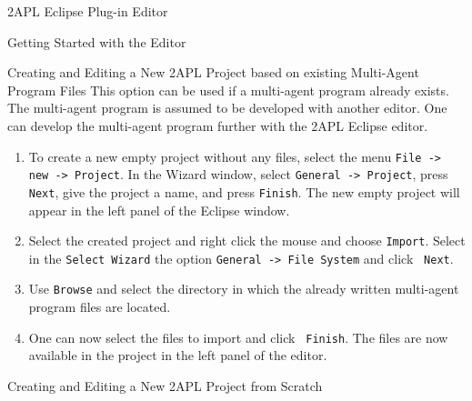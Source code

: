 \begin{chapter}{2APL Eclipse Plug-in Editor}
\begin{section}{Getting Started with the Editor}
\begin{subsection}{Creating and Editing a New 2APL Project based on existing Multi-Agent Program Files}
This option can be used if a multi-agent program already exists. The
multi-agent program is assumed to be developed with another editor.
One can develop the multi-agent program further with the 2APL
Eclipse editor.

\begin{enumerate}
        \item To create a new empty project without any files, select the menu \texttt{File -> new -> Project}.
        In the Wizard window, select \texttt{General -> Project}, press {\tt Next}, give the project
        a name, and press {\tt Finish}. The new empty project will
        appear in the left panel of the Eclipse window.

        \item Select the created project and right click the mouse and choose {\tt Import}.
        Select in the {\tt Select Wizard} the option {\tt General -> File System} and click {\tt
        Next}.

        \item Use {\tt Browse} and select the directory in which the already written multi-agent
        program files are located.

        \item One can now select the files to import and click {\tt
        Finish}. The files are now available in the project in the
        left panel of the editor.
\end{enumerate}

\end{subsection}

\begin{subsection}{Creating and Editing a New 2APL Project from Scratch}


\end{subsection}
\end{section}
\end{chapter}
